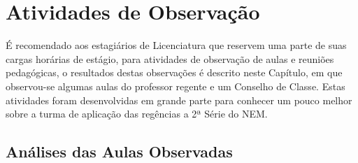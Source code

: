 \chapter{Atividades de Observação} %
\label{chap:Atividades de Observação}
É recomendado aos estagiários de Licenciatura que reservem uma parte de suas cargas horárias de estágio, para atividades de observação de aulas e reuniões pedagógicas, o resultados destas observações é descrito neste Capítulo, em que observou-se algumas aulas do professor regente e um Conselho de Classe. Estas atividades foram desenvolvidas em grande parte para conhecer um pouco melhor sobre a turma de aplicação das regências a 2ª Série do \ac{NEM}.

\section{Análises das Aulas Observadas} %
\label{sub:Análises das Aulas Observadas}
\setlength\intextsep{0pt}
\begin{table}
	\centering
	\caption{Acompanhamento de aulas}
	\label{tab:acompanhamento-aulas}
\end{table}
